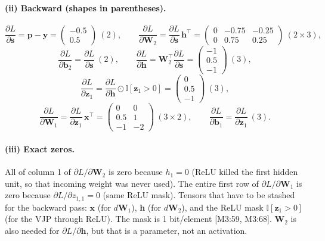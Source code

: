\documentclass[11pt]{article}
\newcommand{\vct}[1]{\mathbf{#1}}
\newcommand{\mat}[1]{\mathbf{#1}}
\begin{document}
\paragraph{(ii) Backward (shapes in parentheses).}
\[
\frac{\partial L}{\partial\vct{s}}=\vct{p}-\vct{y}
=
\begin{pmatrix}-0.5\\0.5\end{pmatrix}\ (2),
\qquad
\frac{\partial L}{\partial\mat{W}_2}
=\frac{\partial L}{\partial\vct{s}}\,\vct{h}^\top
=
\begin{pmatrix}
0 & -0.75 & -0.25 \\
0 &  0.75 &  0.25
\end{pmatrix}\ (2\times 3),
\]
\[
\frac{\partial L}{\partial\vct{b}_2}
=\frac{\partial L}{\partial\vct{s}}\ (2),
\qquad
\frac{\partial L}{\partial\vct{h}}
=\mat{W}_2^\top\frac{\partial L}{\partial\vct{s}}
=
\begin{pmatrix}-1\\0.5\\-1\end{pmatrix}\ (3),
\]
\[
\frac{\partial L}{\partial\vct{z}_1}
=\frac{\partial L}{\partial\vct{h}}\odot\mathbb{I}[\vct{z}_1>0]
=
\begin{pmatrix}0\\0.5\\-1\end{pmatrix}\ (3),
\]
\[
\frac{\partial L}{\partial\mat{W}_1}
=\frac{\partial L}{\partial\vct{z}_1}\,\vct{x}^\top
=
\begin{pmatrix}
0 & 0 \\
0.5 & 1 \\
-1 & -2
\end{pmatrix}\ (3\times 2),
\qquad
\frac{\partial L}{\partial\vct{b}_1}
=\frac{\partial L}{\partial\vct{z}_1}\ (3).
\]

\paragraph{(iii) Exact zeros.}
All of column 1 of \(\partial L/\partial\mat{W}_2\) is zero because
\(h_1=0\) (ReLU killed the first hidden unit, so that incoming weight
was never used). The entire first row of \(\partial L/\partial\mat{W}_1\)
is zero because \(\partial L/\partial z_{1,1}=0\) (same ReLU mask).
Tensors that have to be stashed for the backward pass:
\(\vct{x}\) (for \(d\mat{W}_1\)), \(\vct{h}\) (for \(d\mat{W}_2\)),
and the ReLU mask \(\mathbb{I}[\vct{z}_1>0]\) (for the VJP through
ReLU). The mask is 1 bit/element [M3:59, M3:68]. \(\mat{W}_2\) is also
needed for \(\partial L/\partial\vct{h}\), but that is a parameter, not
an activation.
\end{document}
